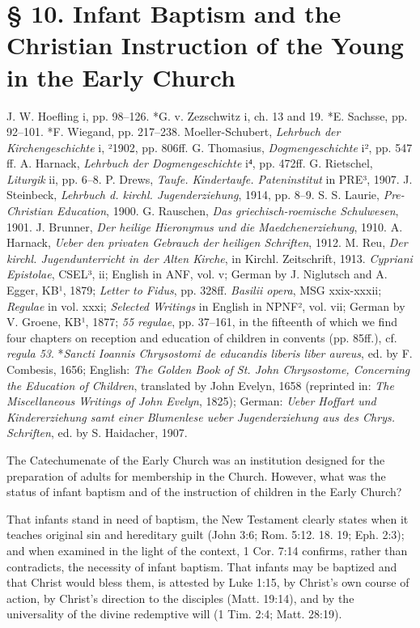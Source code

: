 \section[§ 10. Infant Baptism and Instruction]{§ 10. Infant Baptism and the Christian Instruction of the Young in the Early Church}

J. W. Hoefling i, pp. 98–126. *G. v. Zezschwitz i, ch. 13 and 19. *E. Sachsse, pp. 92–101. *F. Wiegand, pp. 217–238. Moeller-Schubert, \emph{Lehrbuch der Kirchengeschichte} i, ²1902, pp. 806ff. G. Thomasius, \emph{Dogmengeschichte} i², pp. 547 ff. A. Harnack, \emph{Lehrbuch der Dogmengeschichte} i⁴, pp. 472ff. G. Rietschel, \emph{Liturgik} ii, pp. 6–8. P. Drews, \emph{Taufe. Kindertaufe. Pateninstitut} in PRE³, 1907. J. Steinbeck, \emph{Lehrbuch d. kirchl. Jugenderziehung}, 1914, pp. 8–9. S. S. Laurie, \emph{Pre-Christian Education}, 1900. G. Rauschen, \emph{Das griechisch-roemische Schulwesen}, 1901. J. Brunner, \emph{Der heilige Hieronymus und die Maedchenerziehung}, 1910. A. Harnack, \emph{Ueber den privaten Gebrauch der heiligen Schriften}, 1912. M. Reu, \emph{Der kirchl. Jugendunterricht in der Alten Kirche}, in Kirchl. Zeitschrift, 1913. \emph{Cypriani Epistolae}, CSEL³, ii; English in ANF, vol. v; German by J. Niglutsch and A. Egger, KB¹, 1879; \emph{Letter to Fidus}, pp. 328ff. \emph{Basilii opera}, MSG xxix-xxxii; \emph{Regulae} in vol. xxxi; \emph{Selected Writings} in English in NPNF², vol. vii; German by V. Groene, KB¹, 1877; \emph{55 regulae}, pp. 37–161, in the fifteenth of which we find four chapters on reception and education of children in convents (pp. 85ff.), cf. \emph{regula 53}. *\emph{Sancti Ioannis Chrysostomi de educandis liberis liber aureus}, ed. by F. Combesis, 1656; English: \emph{The Golden Book of St. John Chrysostome, Concerning the Education of Children}, translated by John Evelyn, 1658 (reprinted in: \emph{The Miscellaneous Writings of John Evelyn}, 1825); German: \emph{Ueber Hoffart und Kindererziehung samt einer Blumenlese ueber Jugenderziehung aus des Chrys. Schriften}, ed. by S. Haidacher, 1907.

The Catechumenate of the Early Church was an institution designed for the preparation of adults for membership in the Church. However, what was the status of infant baptism and of the instruction of children in the Early Church?

That infants stand in need of baptism, the New Testament clearly states when it teaches original sin and hereditary
guilt (John 3:6; Rom. 5:12. 18. 19; Eph. 2:3); and when examined in the light of the context, 1 Cor. 7:14 confirms, rather than contradicts, the necessity of infant baptism. That infants may be baptized and that Christ would bless them, is attested by Luke 1:15, by Christ’s own course of action, by Christ’s direction to the disciples (Matt. 19:14), and by the universality of the divine redemptive will (1 Tim. 2:4; Matt. 28:19).

